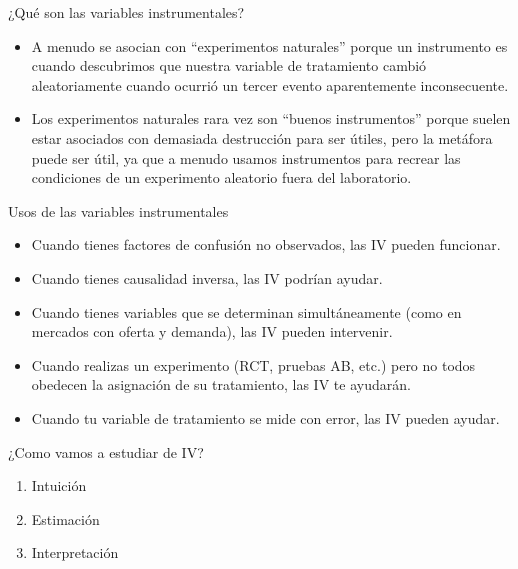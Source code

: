 \documentclass{beamer}
\begin{document}
\begin{frame}{¿Qué son las variables instrumentales?}

\begin{itemize} 
\item A menudo se asocian con ``experimentos naturales'' porque un instrumento es cuando descubrimos que nuestra variable de tratamiento cambió aleatoriamente cuando ocurrió un tercer evento aparentemente inconsecuente. 
\item Los experimentos naturales rara vez son ``buenos instrumentos'' porque suelen estar asociados con demasiada destrucción para ser útiles, pero la metáfora puede ser útil, ya que a menudo usamos instrumentos para recrear las condiciones de un experimento aleatorio fuera del laboratorio. 

\end{itemize}

\end{frame}


\begin{frame}{Usos de las variables instrumentales}

\begin{itemize}
\item Cuando tienes factores de confusión no observados, las IV pueden funcionar.
\item Cuando tienes causalidad inversa, las IV podrían ayudar.
\item Cuando tienes variables que se determinan simultáneamente (como en mercados con oferta y demanda), las IV pueden intervenir.
\item Cuando realizas un experimento (RCT, pruebas AB, etc.) pero no todos obedecen la asignación de su tratamiento, las IV te ayudarán.
\item Cuando tu variable de tratamiento se mide con error, las IV pueden ayudar.
\end{itemize}

\end{frame}

\begin{frame}{¿Como vamos a estudiar de IV?}

\begin{enumerate}
    \item Intuición
    \item Estimación
    \item Interpretación
\end{enumerate}


\end{frame}
\end{document}
